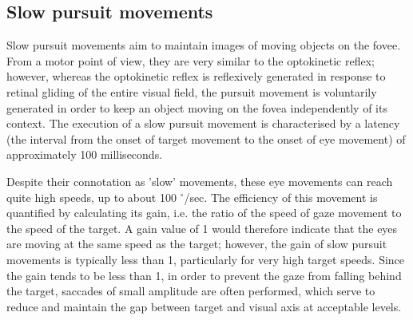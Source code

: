 \documentclass[11pt]{article}
\begin{document}
\subsection{Slow pursuit movements}
Slow pursuit movements aim to maintain images of moving objects on the fovee. From a motor point of view, they are very similar to the optokinetic reflex; however, whereas the optokinetic reflex is reflexively generated in response to retinal gliding of the entire visual field, the pursuit movement is voluntarily generated in order to keep an object moving on the fovea independently of its context. The execution of a slow pursuit movement is characterised by a latency (the interval from the onset of target movement to the onset of eye movement) of approximately 100 milliseconds.

Despite their connotation as 'slow' movements, these eye movements can reach quite high speeds, up to about 100 $^{\circ}$/sec. The efficiency of this movement is quantified by calculating its gain, i.e. the ratio of the speed of gaze movement to the speed of the target. A gain value of 1 would therefore indicate that the eyes are moving at the same speed as the target; however, the gain of slow pursuit movements is typically less than 1, particularly for very high target speeds. Since the gain tends to be less than 1, in order to prevent the gaze from falling behind the target, saccades of small amplitude are often performed, which serve to reduce and maintain the gap between target and visual axis at acceptable levels.
\end{document}
